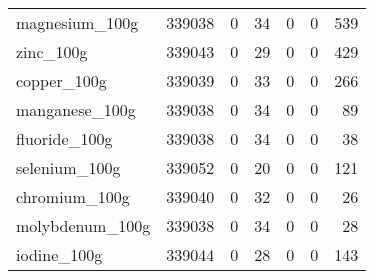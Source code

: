 \begin{tabular}{lrrrrrr}
magnesium\_100g                             &                                        339038 &                                         0 &                                            34 &                                         0 &                      0 &              539 \\
zinc\_100g                                  &                                        339043 &                                         0 &                                            29 &                                         0 &                      0 &              429 \\
copper\_100g                                &                                        339039 &                                         0 &                                            33 &                                         0 &                      0 &              266 \\
manganese\_100g                             &                                        339038 &                                         0 &                                            34 &                                         0 &                      0 &               89 \\
fluoride\_100g                              &                                        339038 &                                         0 &                                            34 &                                         0 &                      0 &               38 \\
selenium\_100g                              &                                        339052 &                                         0 &                                            20 &                                         0 &                      0 &              121 \\
chromium\_100g                              &                                        339040 &                                         0 &                                            32 &                                         0 &                      0 &               26 \\
molybdenum\_100g                            &                                        339038 &                                         0 &                                            34 &                                         0 &                      0 &               28 \\
iodine\_100g                                &                                        339044 &                                         0 &                                            28 &                                         0 &                      0 &              143 \\

\end{tabular}
